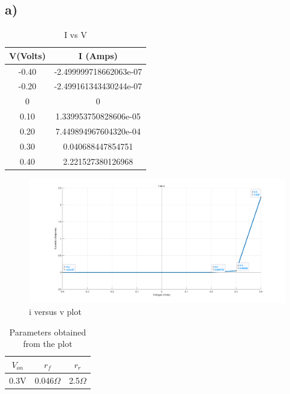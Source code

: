 \documentclass[letterpaper,12pt]{article}
\begin{document}
\subsection{a)}


\begin{table}[H]
\begin{center}
\caption{ I vs V}
\vspace{2mm}
\begin{tabular}{||c | c ||} 
\hline
V(Volts) & I (Amps) \\ [0.5ex] 
\hline\hline
-0.40 & -2.499999718662063e-07  \\ 
\hline
-0.20 & -2.499161343430244e-07  \\ 
\hline
0 & 0  \\ 
\hline
0.10 & 1.339953750828606e-05  \\ 
\hline
0.20 & 7.449894967604320e-04  \\ 
\hline
0.30 & 0.040688447854751  \\ 
\hline
0.40 & 2.221527380126968  \\ 
\hline
\end{tabular}
\end{center}
\end{table}


\begin{figure}[H]
\centering
\includegraphics[width=1\textwidth]{3a.png}
\caption{i versus v plot}
\end{figure} 
    
\begin{table}[H]
    \begin{center}
    \caption{ Parameters obtained from the plot}
    \vspace{2mm}
    \begin{tabular}{||c | c | c ||} 
    \hline
    \(V_{on}\) &  \(r_f\) & \(r_r\)\\ [0.5ex] 
    \hline\hline
    0.3V & 0.046\(\Omega\)  & 2.5\(\Omega\)   \\ 
    
\hline
\end{tabular}
\end{center}
\end{table}
    
\end{document}
